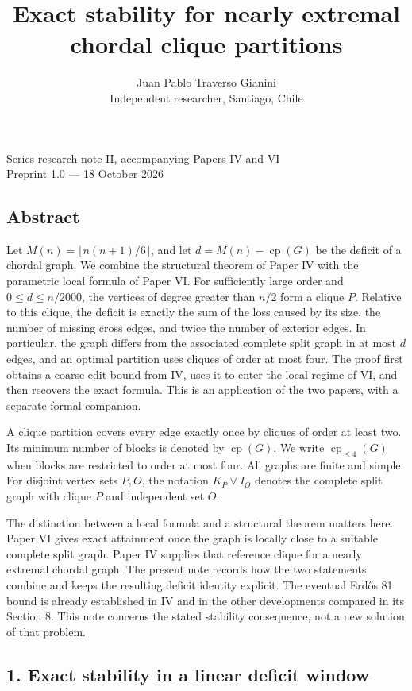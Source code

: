 \documentclass[english,11pt,a4paper]{article}
\title{Exact stability for nearly extremal chordal clique partitions}
\author{Juan Pablo Traverso Gianini\\
Independent researcher, Santiago, Chile}
\date{}
\begin{document}
\raggedbottom\maketitle
Series research note II, accompanying Papers IV and VI\\
Preprint 1.0 --- 18 October 2026

\subsection{Abstract}\label{abstract}

Let \(M(n)=\lfloor n(n+1)/6\rfloor\), and let
\(d=M(n)-\operatorname{cp}(G)\) be the deficit of a chordal graph. We
combine the structural theorem of Paper IV with the parametric local
formula of Paper VI. For sufficiently large order and
\(0\le d\le n/2000\), the vertices of degree greater than \(n/2\) form a
clique \(P\). Relative to this clique, the deficit is exactly the sum of
the loss caused by its size, the number of missing cross edges, and
twice the number of exterior edges. In particular, the graph differs
from the associated complete split graph in at most \(d\) edges, and an
optimal partition uses cliques of order at most four. The proof first
obtains a coarse edit bound from IV, uses it to enter the local regime
of VI, and then recovers the exact formula. This is an application of
the two papers, with a separate formal companion.

A clique partition covers every edge exactly once by cliques of order at
least two. Its minimum number of blocks is denoted by
\(\operatorname{cp}(G)\). We write \(\operatorname{cp}_{\le4}(G)\) when
blocks are restricted to order at most four. All graphs are finite and
simple. For disjoint vertex sets \(P,O\), the notation \(K_P\vee I_O\)
denotes the complete split graph with clique \(P\) and independent set
\(O\).

The distinction between a local formula and a structural theorem matters
here. Paper VI gives exact attainment once the graph is locally close to
a suitable complete split graph. Paper IV supplies that reference clique
for a nearly extremal chordal graph. The present note records how the
two statements combine and keeps the resulting deficit identity
explicit. The eventual Erdős 81 bound is already established in IV and
in the other developments compared in its Section 8. This note concerns
the stated stability consequence, not a new solution of that problem.

\subsection{1. Exact stability in a linear deficit
window}\label{exact-stability-in-a-linear-deficit-window}
\end{document}
